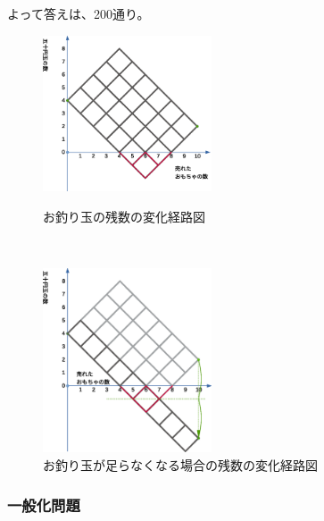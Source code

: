 よって答えは、200通り。


\begin{figure}
  \begin{minipage}[c]{.49\linewidth}  %
  \centering
  \includegraphics[width=5cm]{S030/Figs/Figure.change.p01.eps}
  \caption{お釣り玉の残数の変化経路図}
  \label{fig:S030/Figs/Figure.change.p01}
  \end{minipage}~
  \begin{minipage}[c]{.49\linewidth}  %
  \centering
  \includegraphics[width=5cm]{S030/Figs/Figure.change.p02.eps}
  \caption{お釣り玉が足らなくなる場合の残数の変化経路図}
  \label{fig:S030/Figs/Figure.change.p02}
  \end{minipage}
\end{figure}


\subsubsection{一般化問題}
\label{sssec:お釣り:解答:一般化問題}

